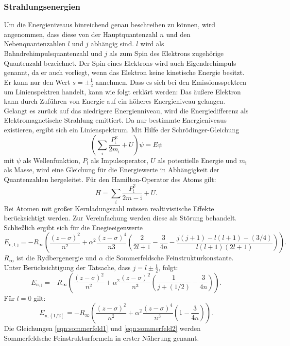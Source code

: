\subsubsection{Strahlungsenergien}
Um die Energieniveaus hinreichend genau beschreiben zu können, wird angenommen, dass diese von der Hauptquantenzahl $n$ und den Nebenquantenzahlen $l$ und $j$ abhängig sind. $l$ wird als Bahndrehimpulsquantenzahl und $j$ als zum Spin des Elektrons zugehörige Quantenzahl bezeichnet. Der Spin eines Elektrons wird auch Eigendrehimpuls genannt, da er auch vorliegt, wenn das Elektron keine kinetische Energie besitzt. Er kann nur den Wert $s=\pm\frac{1}{2}$ annehmen.
Dass es sich bei den Emissionsspektren um Linienspektren handelt, kann wie folgt erklärt werden:
Das äußere Elektron kann durch Zuführen von Energie auf ein höheres Energieniveau gelangen. Gelangt es zurück auf das niedrigere Energienniveau, wird die Energiedifferenz als Elektromagnetische Strahlung emittiert. Da nur bestimmte Energieniveaus existieren, ergibt sich ein Linienspektrum.
Mit Hilfe der Schrödinger-Gleichung
\begin{equation}
  \left(\sum_{i}\frac{P_\mathrm{i}^2}{2m_\mathrm{i}}+U\right)\psi =  E\psi
\end{equation}
mit $\psi$ als Wellenfunktion, $P_\mathrm{i}$ als Impulsoperator, $U$ als potentielle Energie und $m_\mathrm{i}$ als Masse, wird eine Gleichung für die Energiewerte in Abhängigkeit der Quantenzahlen hergeleitet. Für den Hamilton-Operator des Atoms gilt:
\begin{equation}
  H=\sum_{i}\frac{P_\mathrm{i}^2}{2m-\mathrm{i}} + U.
\end{equation}
Bei Atomen mit großer Kernladungszahl müssen realtivistische Effekte berücksichtigt werden. Zur Vereinfachung werden diese als Störung behandelt. Schließlich ergibt sich für die Enegieeigenwerte
\begin{equation}
  E_\mathrm{n,l,j} = -R_\infty \left(\frac{(z-\sigma)^2}{n^2}+\alpha^2\frac{(z-\sigma)^4}{n3}\left(\frac{2}{2l+1}-\frac{3}{4n}-\frac{j(j+1)-l(l+1)-(3/4)}{l(l+1)(2l+1)}\right)\right).
\end{equation}
$R_\infty$ ist die Rydbergenergie und $\alpha$ die Sommerfeldsche Feinstrukturkonstante. Unter Berücksichtigung der Tatsache, dass $j=l \pm \frac{1}{2}$, folgt:
\begin{equation}
  \label{eqn:sommerfeld1}
  E_\mathrm{n,j}= -R_\infty \left(\frac{(z-\sigma)^2}{n^2}+\alpha^2\frac{(z-\sigma)^2}{n^3}\left(\frac{1}{j+(1/2)} -\frac{3}{4n}\right)\right).
\end{equation}
Für $l=0$ gilt:
\begin{equation}
  \label{eqn:sommerfeld2}
  E_\mathrm{n,(1/2)} = -R_\infty \left(\frac{(z-\sigma)^2}{n^2}+\alpha^2\frac{(z-\sigma)^4}{n^3} \left( 1-\frac{3}{4n}\right)\right).
\end{equation}
Die Gleichungen \ref{eqn:sommerfeld1} und \ref{eqn:sommerfeld2} werden Sommerfeldsche Feinstrukturformeln in erster Näherung genannt.

